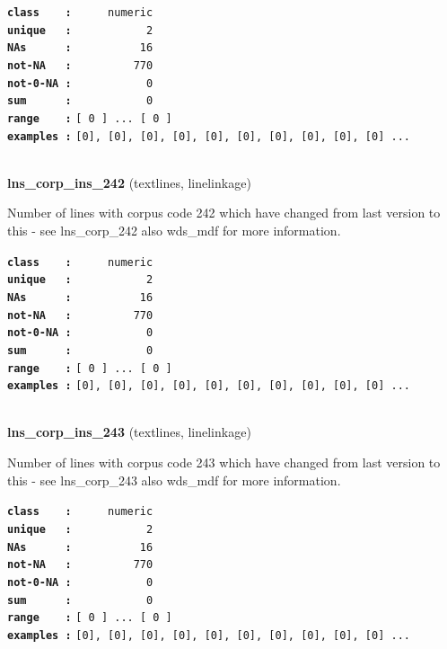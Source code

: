 \documentclass[]{article}
\begin{document}
\textbf{\texttt{class\ \ \ \ :}} \texttt{~~~~~numeric}\\
\textbf{\texttt{unique\ \ \ :}} \texttt{~~~~~~~~~~~2}\\
\textbf{\texttt{NAs\ \ \ \ \ \ :}} \texttt{~~~~~~~~~~16}\\
\textbf{\texttt{not-NA\ \ \ :}} \texttt{~~~~~~~~~770}\\
\textbf{\texttt{not-0-NA\ :}} \texttt{~~~~~~~~~~~0}\\
\textbf{\texttt{sum\ \ \ \ \ \ :}} \texttt{~~~~~~~~~~~0}\\
\textbf{\texttt{range\ \ \ \ :}}
\texttt{{[}\ 0\ {]}\ ...\ {[}\ 0\ {]}}\\
\textbf{\texttt{examples\ :}}
\texttt{{[}0{]},\ {[}0{]},\ {[}0{]},\ {[}0{]},\ {[}0{]},\ {[}0{]},\ {[}0{]},\ {[}0{]},\ {[}0{]},\ {[}0{]}\ ...}\\

~

\textbf{lns\_corp\_ins\_242} (textlines, linelinkage)

Number of lines with corpus code 242 which have changed from last
version to this - see lns\_corp\_242 also wds\_mdf for more information.

\textbf{\texttt{class\ \ \ \ :}} \texttt{~~~~~numeric}\\
\textbf{\texttt{unique\ \ \ :}} \texttt{~~~~~~~~~~~2}\\
\textbf{\texttt{NAs\ \ \ \ \ \ :}} \texttt{~~~~~~~~~~16}\\
\textbf{\texttt{not-NA\ \ \ :}} \texttt{~~~~~~~~~770}\\
\textbf{\texttt{not-0-NA\ :}} \texttt{~~~~~~~~~~~0}\\
\textbf{\texttt{sum\ \ \ \ \ \ :}} \texttt{~~~~~~~~~~~0}\\
\textbf{\texttt{range\ \ \ \ :}}
\texttt{{[}\ 0\ {]}\ ...\ {[}\ 0\ {]}}\\
\textbf{\texttt{examples\ :}}
\texttt{{[}0{]},\ {[}0{]},\ {[}0{]},\ {[}0{]},\ {[}0{]},\ {[}0{]},\ {[}0{]},\ {[}0{]},\ {[}0{]},\ {[}0{]}\ ...}\\

~

\textbf{lns\_corp\_ins\_243} (textlines, linelinkage)

Number of lines with corpus code 243 which have changed from last
version to this - see lns\_corp\_243 also wds\_mdf for more information.

\textbf{\texttt{class\ \ \ \ :}} \texttt{~~~~~numeric}\\
\textbf{\texttt{unique\ \ \ :}} \texttt{~~~~~~~~~~~2}\\
\textbf{\texttt{NAs\ \ \ \ \ \ :}} \texttt{~~~~~~~~~~16}\\
\textbf{\texttt{not-NA\ \ \ :}} \texttt{~~~~~~~~~770}\\
\textbf{\texttt{not-0-NA\ :}} \texttt{~~~~~~~~~~~0}\\
\textbf{\texttt{sum\ \ \ \ \ \ :}} \texttt{~~~~~~~~~~~0}\\
\textbf{\texttt{range\ \ \ \ :}}
\texttt{{[}\ 0\ {]}\ ...\ {[}\ 0\ {]}}\\
\textbf{\texttt{examples\ :}}
\texttt{{[}0{]},\ {[}0{]},\ {[}0{]},\ {[}0{]},\ {[}0{]},\ {[}0{]},\ {[}0{]},\ {[}0{]},\ {[}0{]},\ {[}0{]}\ ...}\\
\end{document}
